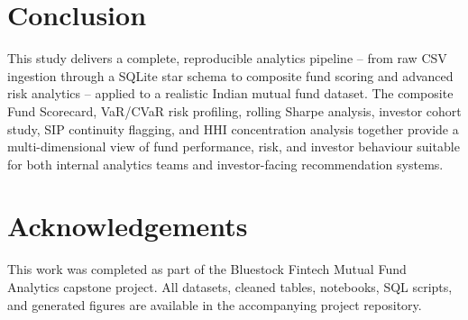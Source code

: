 \documentclass[10pt,twocolumn]{article}
\begin{document}
\section{Conclusion}
This study delivers a complete, reproducible analytics pipeline -- from raw
CSV ingestion through a SQLite star schema to composite fund scoring and
advanced risk analytics -- applied to a realistic Indian mutual fund
dataset. The composite Fund Scorecard, VaR/CVaR risk profiling, rolling
Sharpe analysis, investor cohort study, SIP continuity flagging, and HHI
concentration analysis together provide a multi-dimensional view of fund
performance, risk, and investor behaviour suitable for both internal
analytics teams and investor-facing recommendation systems.

\section*{Acknowledgements}
This work was completed as part of the Bluestock Fintech Mutual Fund
Analytics capstone project. All datasets, cleaned tables, notebooks, SQL
scripts, and generated figures are available in the accompanying project
repository.
\end{document}
